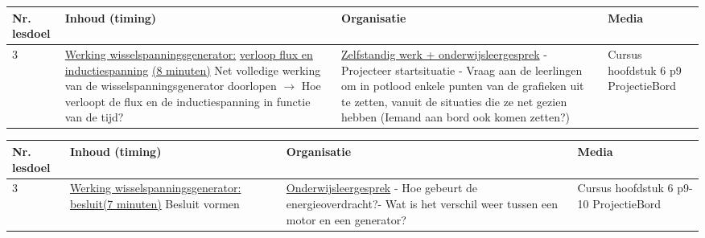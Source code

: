 \begin{landscape}
\begin{tabularx}{1.56\textwidth}{|p{1.5cm}|p{8cm}|X|p{4cm}|}
	\hline
	\textbf{Nr. lesdoel } & \textbf{Inhoud (timing)}  & \textbf{Organisatie } & \textbf{Media } \\ \hline
	3& \underline{Werking wisselspanningsgenerator:} \underline{verloop flux en inductiespanning} \underline{(8 minuten)}\newline
	Net volledige werking van de wisselspanningsgenerator doorlopen $\rightarrow$  Hoe verloopt de flux  en de inductiespanning in functie van de tijd?
	&  \underline{Zelfstandig werk + onderwijsleergesprek}\newline  
	- Projecteer startsituatie \newline
	- Vraag aan de leerlingen om in potlood enkele punten van de grafieken uit te zetten, vanuit de situaties die ze net gezien hebben (Iemand aan bord ook komen zetten?)\newline
	&  Cursus hoofdstuk 6 p9 \newline\newline Projectie\newline\newline Bord
	\\ \hline
\end{tabularx}\vspace{5mm}



\begin{tabularx}{1.56\textwidth}{|p{1.5cm}|p{8cm}|X|p{4cm}|}
	\hline
	\textbf{Nr. lesdoel } & \textbf{Inhoud (timing)}  & \textbf{Organisatie } & \textbf{Media } \\ \hline
	3& \underline{Werking wisselspanningsgenerator:} \underline{besluit(7 minuten)}\newline 
	Besluit vormen 
	&  \underline{Onderwijsleergesprek}\newline  
	- Hoe gebeurt de energieoverdracht?\newline - Wat is het verschil weer tussen een motor en een generator?
	&  Cursus hoofdstuk 6 p9-10 \newline\newline Projectie\newline\newline Bord
	\\ \hline
\end{tabularx}\vspace{5mm}





\end{landscape}
